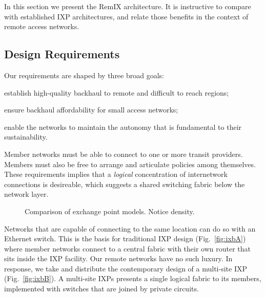 In this section we present the RemIX architecture. It is instructive
to compare with established IXP architectures, and relate those
benefits in the context of remote access networks.

\subsection{Design Requirements}

Our requirements are shaped by three broad goals:
\begin{inparaenum}[(i)]
  \item establish high-quality backhaul to remote and difficult to
    reach regions;
  \item ensure backhaul affordability for small access networks;
  \item enable the networks to maintain the autonomy that is
    fundamental to their sustainability.
\end{inparaenum}
Member networks must be able to connect to one or more transit providers.
Members must also be free to arrange and articulate policies among themselves.
These requirements implies that a \emph{logical} concentration of internetwork
connections is desireable, which suggests a shared switching fabric below the
network layer.

\begin{figure*}
   \hfill
   \hfill
  \subfloat[RemIX]{
    \resizebox{0.6\columnwidth}{!}{
      \begin{tikzpicture}
        \ixboxesC
      \end{tikzpicture}
      \label{fig:ixbC}
    }
  }
  \caption{Comparison of exchange point models. Notice density.}
  \label{fig:ixb}
\end{figure*}

Networks that are capable of connecting to the same location can do so with an
Ethernet switch. This is the basis for traditional \ac{IXP} design (Fig.~\ref{fig:ixbA}) where member networks connect to a central fabric
with their own router that sits inside the IXP facility. Our remote networks
have no such luxury. In response, we take and distribute the contemporary design
of a multi-site \ac{IXP} (Fig.~\ref{fig:ixbB}). A multi-site \acp{IXP}
presents a single logical fabric to its members, implemented with switches
that are joined by private circuits.

